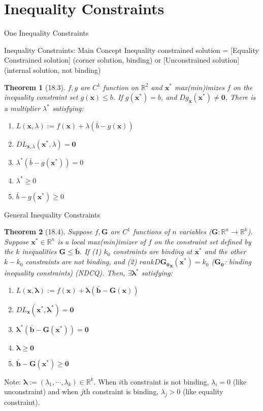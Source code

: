 \documentclass[final]{beamer}
\newtheorem{thm}{Theorem}
\newcommand{\bb}{\mathbb}
\newcommand{\bd}{\mathbf}
\begin{document}
\section{Inequality Constraints} %
\label{sec:inequality_constraints}
\begin{frame}[t]{One Inequality Constraints}
	\begin{block}
		{Inequality Constraints: Main Concept}
		Inequality constrained solution = [Equality Constrained solution] (corner solution, binding) or [Unconstrained solution] (internal solution, not binding)
	\end{block}
	\begin{thm}
		[18.3] $f,g$ are $C^1$ function on $\bb{R}^2$ and $\bd{x^\ast}$ max(min)imizes $f$ on the inequality constraint set $g(\bd{x})\le b$. If $g(\bd{x^\ast})=b$, and $Dg_{\bd{x}}(\bd{x^\ast})\neq \bd{0}$, There is a multiplier $\lambda^\ast$ satisfying:
		\begin{enumerate}
			\item $L(\bd{x},\lambda):=f(\bd{x})+\lambda(\bar{b}-g(\bd{x}))$
			\item $DL_{\bd{x},\lambda}(\bd{x^\ast},\lambda)=\bd{0}$
			\item $\lambda^\ast(\bar{b}-g(\bd{x^\ast}))=0$
			\item $\lambda^\ast\ge 0$
			\item $\bar{b}-g(\bd{x^\ast})\ge 0$
		\end{enumerate}
	\end{thm}
\end{frame}

\begin{frame}[t]{General Inequality Constraints}
	\begin{thm}
		[18.4] Suppose $f,\bd{G}$ are $C^1$ functions of $n$ variables ($\bd{G}:\bb{R}^n\rightarrow\bb{R}^k$). Suppose $\bd{x^\ast}\in\bb{R}^n$ is a local max(min)imizer of $f$ on the constraint set defined by the $k$  inequalities $\bd{G}\le \bar{\bd{b}}$. If (1) $k_0$ constraints are binding at $\bd{x^\ast}$ and the other $k-k_0$ constraints are not binding, and (2) $rank D\bd{G_0}_{\bd{x}}(\bd{x^\ast})= k_0$ ($\bd{G_0}$: binding inequality constraints) (NDCQ). Then, $\exists\bd{\lambda^\ast}$ satisfying:
		\begin{enumerate}
			\item $L(\bd{x},\bd{\lambda}):=f(\bd{x})+\bd{\lambda}(\bar{\bd{b}}-\bd{G}(\bd{x}))$
			\item $DL_{\bd{x}}(\bd{x^\ast,\lambda^\ast})=\bd{0}$
			\item $\bd{\lambda^\ast}(\bar{\bd{b}}-\bd{G}(\bd{x^\ast}))=\bd{0}$
			\item $\bd{\lambda}\ge \bd{0}$
			\item $\bar{\bd{b}}-\bd{G}(\bd{x^\ast})\ge \bd{0}$
		\end{enumerate}
	\end{thm}
	Note: $\bd{\lambda}:=(\lambda_1,\cdots,\lambda_k)\in \bb{R}^k$. When $i$th constraint is not binding, $\lambda_i=0$ (like unconstraint) and when $j$th constraint is binding, $\lambda_j> 0$ (like equality constraint).
\end{frame}
\end{document}
